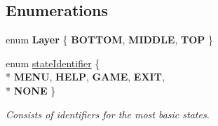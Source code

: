 \subsection*{Enumerations}
\begin{DoxyCompactItemize}
\item 
enum {\bfseries Layer} \{ {\bfseries B\-O\-T\-T\-O\-M}, 
{\bfseries M\-I\-D\-D\-L\-E}, 
{\bfseries T\-O\-P}
 \}
\item 
enum \hyperlink{namespacewp__engine_aae123481cdcc6dc4c4474c1b0b62b152}{state\-Identifier} \{ \\*
{\bfseries M\-E\-N\-U}, 
{\bfseries H\-E\-L\-P}, 
{\bfseries G\-A\-M\-E}, 
{\bfseries E\-X\-I\-T}, 
\\*
{\bfseries N\-O\-N\-E}
 \}
\begin{DoxyCompactList}\small\item\em Consists of identifiers for the most basic states. \end{DoxyCompactList}\end{DoxyCompactItemize}
